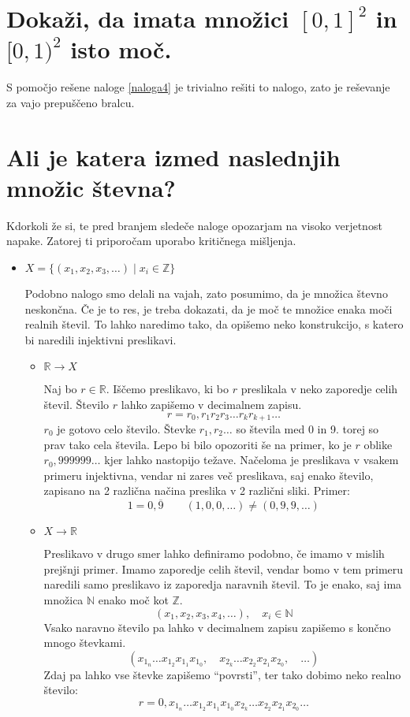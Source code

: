 \documentclass[a4paper, 12pt]{article}
\newcommand{\NN}{\ensuremath{\mathbb{N}}}
\newcommand{\ZZ}{\ensuremath{\mathbb{Z}}}
\newcommand{\RR}{\ensuremath{\mathbb{R}}}
\begin{document}
    \section{Dokaži, da imata množici $[0, 1]^2$ in $[0, 1)^2$ isto moč.}
    S pomočjo rešene naloge \ref{naloga4} je trivialno rešiti to nalogo, zato je reševanje za vajo prepuščeno bralcu.
    
    \section{Ali je katera izmed naslednjih množic števna?}
    Kdorkoli že si, te pred branjem sledeče naloge opozarjam na visoko verjetnost napake. Zatorej ti priporočam uporabo kritičnega mišljenja.
    \begin{itemize}
        \item $X = \{(x_1, x_2, x_3, \ldots ) \mid x_i \in \ZZ \}$
        
        Podobno nalogo smo delali na vajah, zato posumimo, da je množica števno neskončna. Če je to res, je treba dokazati, da je moč te množice enaka moči realnih števil. To lahko naredimo tako, da opišemo neko konstrukcijo, s katero bi naredili injektivni preslikavi.
        
        \begin{itemize}
            \item $\RR \to X$
            
            Naj bo $r \in \RR$. Iščemo preslikavo, ki bo $r$ preslikala v neko zaporedje celih števil. Število $r$ lahko zapišemo v decimalnem zapisu.
            \[
            r = r_0, r_1 r_2 r_3 \ldots r_k r_{k+1} \ldots
            \]
            $r_0$ je gotovo celo število. Števke $r_1, r_2  \ldots$ so števila med 0 in 9. torej so prav tako cela števila. Lepo bi bilo opozoriti še na primer, ko je $r$ oblike $r_0,999999\ldots$ kjer lahko nastopijo težave. Načeloma je preslikava v vsakem primeru injektivna, vendar ni zares več preslikava, saj enako število, zapisano na 2 različna načina preslika v 2 različni sliki. Primer:
            \[
            1 = 0,\overline{9} \qquad (1, 0, 0, \ldots) \neq (0, 9, 9, \ldots)
            \]
            
            \item $X \to \RR$
            
            Preslikavo v drugo smer lahko definiramo podobno, če imamo v mislih prejšnji primer. Imamo zaporedje celih števil, vendar bomo v tem primeru naredili samo preslikavo iz zaporedja naravnih števil. To je enako, saj ima množica $\NN$ enako moč kot $\ZZ$. 
            \[
            (x_1, x_2, x_3, x_4, \ldots), \quad x_i \in \NN
            \] 
            Vsako naravno število pa lahko v decimalnem zapisu zapišemo s končno mnogo števkami.
            \[
            (x_{1_n} \ldots x_{1_2} x_{1_1} x_{1_0},\quad
            x_{2_k} \ldots x_{2_2} x_{2_1} x_{2_0}, \quad\ldots)
            \]
            Zdaj pa lahko vse števke zapišemo ``povrsti'', ter tako dobimo neko realno število:
            \[
            r = 0, x_{1_n} \ldots x_{1_2} x_{1_1} x_{1_0}
                    x_{2_k} \ldots x_{2_2} x_{2_1} x_{2_0} \ldots
            \]
        \end{itemize}
        

\end{itemize}
\end{document}
